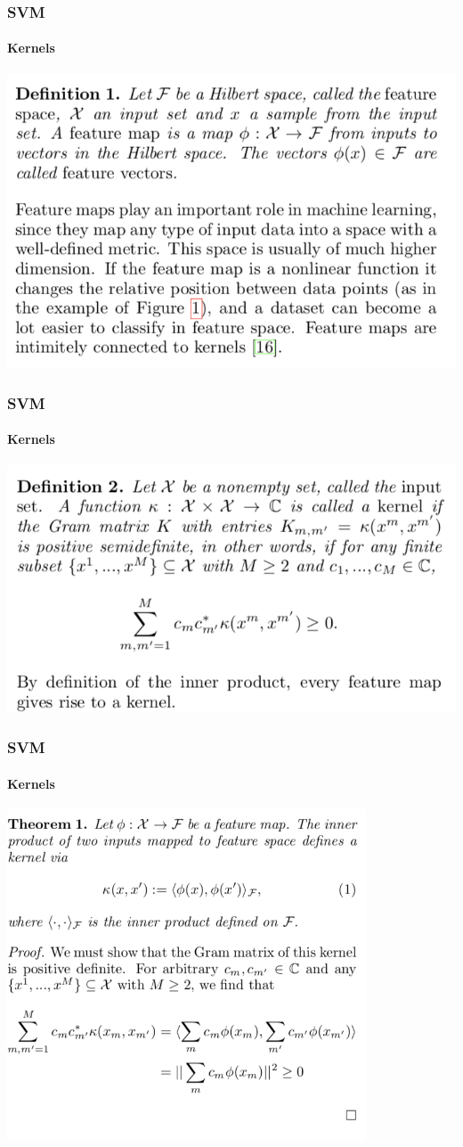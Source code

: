 \documentclass{beamer}
\newcommand\0{\mathbf{0}}
\begin{document}
  \begin{frame}
  	\frametitle{SVM}
  	\framesubtitle{Kernels}
  	\includegraphics[width=\textwidth]{kernel_dfn_1.png}
  \end{frame}
  
  \begin{frame}
  	\frametitle{SVM}
  	\framesubtitle{Kernels}
  	\includegraphics[width=\textwidth]{kernel_dfn_2.png}
  \end{frame}
  
  \begin{frame}
  	\frametitle{SVM}
  	\framesubtitle{Kernels}
  	\includegraphics[width=0.8\textwidth]{kernel_dfn_3.png}
  \end{frame}
  
\end{document}

